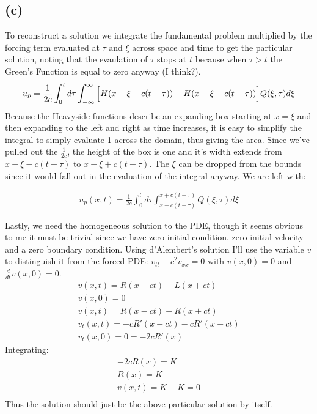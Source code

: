 \documentclass{article}
\begin{document}
\subsection*{\textbf{(c)}}
To reconstruct a solution we integrate the fundamental problem multiplied by the forcing term evaluated at $\tau$ and $\xi$ across space and time to get the particular solution, noting that the evaulation of $\tau$ stops at $t$ because when $\tau > t$ the Green's Function is equal to zero anyway (I think?). 
\begin{equation}
\begin{aligned}
u_p = \frac{1}{2c}\int_0^t d\tau \int_{-\infty}^\infty \Big{[}H(x - \xi + c(t-\tau)) - H(x- \xi - c(t-\tau)) \Big{]} Q(\xi,\tau)d\xi
\end{aligned}
\end{equation}
Because the Heavyside functions describe an expanding box starting at $x=\xi$ and then expanding to the left and right as time increases, it is easy to simplify the integral to simply evaluate 1 across the domain, thus giving the area. Since we've pulled out the $\frac{1}{2c}$, the height of the box is one and it's width extends from $x-\xi - c(t-\tau)$ to $x-\xi + c(t-\tau)$. The $\xi$ can be dropped from the bounds since it would fall out in the evaluation of the integral anyway. We are left with:
\begin{tcolorbox}[minipage,colback=white,arc=0pt,outer arc=0pt]
\begin{equation}
\begin{aligned}
u_p(x,t) = \frac{1}{2c}\int_0^td\tau\int_{x-c(t-\tau)}^{x+c(t-\tau)}Q(\xi,\tau)d\xi
\end{aligned}
\end{equation}
\end{tcolorbox}
Lastly, we need the homogeneous solution to the PDE, though it seems obvious to me it must be trivial since we have zero initial condition, zero initial velocity and a zero boundary condition. Using d'Alembert's solution I'll use the variable $v$ to distinguish it from the forced PDE: $v_{tt} -c^2v_{xx} = 0$ with $v(x,0) = 0$ and $\frac{d}{dt}v(x,0) = 0$.
\begin{equation}
\begin{aligned}
v(x,t) = R(x-ct) + L(x+ct)\\
v(x,0) = 0\\
v(x,t) = R(x-ct) - R(x+ct)\\
v_t(x,t) = -cR'(x-ct) - cR'(x+ct)\\
v_t(x,0) = 0 = -2cR'(x)
\end{aligned}
\end{equation}
Integrating:
\begin{equation}
\begin{aligned}
-2cR(x) = K\\
R(x) = K\\
v(x,t) = K - K = 0\\
\end{aligned}
\end{equation}
Thus the solution should just be the above particular solution by itself.
\end{document}
